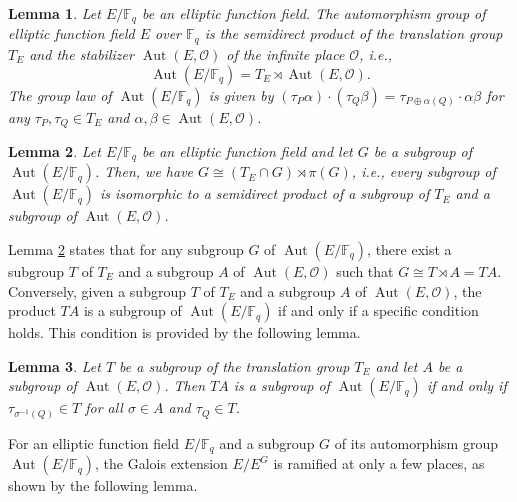 \documentclass[journal,12pt,onecolumn]{IEEEtran}
\newtheorem{lemma}{Lemma}
\begin{document}
\begin{lemma}\label{ell_func_auto}
    Let \( E/\mathbb{F}_q \) be an elliptic function field. The automorphism group of elliptic function field \( E \) over \( \mathbb{F}_q \) is the semidirect product of the translation group \( T_E \) and the stabilizer \( \operatorname{Aut}(E, \mathcal{O}) \) of the infinite place \( \mathcal{O} \), i.e., 
    \[
        \operatorname{Aut}(E/\mathbb{F}_q) = T_E \rtimes \operatorname{Aut}(E, \mathcal{O}).
    \]
    The group law of \( \operatorname{Aut}(E/\mathbb{F}_q) \) is given by \( (\tau_P\alpha) \cdot (\tau_Q\beta) = \tau_{P\oplus\alpha(Q)} \cdot \alpha\beta \) for any \( \tau_P, \tau_Q \in T_E \) and \( \alpha, \beta \in \operatorname{Aut}(E, \mathcal{O}) \).
\end{lemma}

\begin{lemma}\label{ell_func_auto_sub}
    Let \( E/\mathbb{F}_q \) be an elliptic function field and let \( G \) be a subgroup of  \( \operatorname{Aut}(E/\mathbb{F}_q) \). Then, we have \( G \cong (T_E \cap G) \rtimes \pi(G) \), i.e., every subgroup of \( \operatorname{Aut}(E/\mathbb{F}_q) \) is isomorphic to a semidirect product of a subgroup of \( T_E \) and a subgroup of \( \operatorname{Aut}(E, \mathcal{O}) \).
\end{lemma}

Lemma \ref{ell_func_auto_sub} states that for any subgroup $G$ of $\operatorname{Aut}(E/\mathbb{F}_q)$, there exist a subgroup $T$ of $T_E$ and a subgroup $A$ of $\operatorname{Aut}(E, \mathcal{O})$ such that $G \cong T \rtimes A = TA$. Conversely, given a subgroup $T$ of $T_E$ and a subgroup $A$ of $\operatorname{Aut}(E, \mathcal{O})$, the product $TA$ is a subgroup of $\operatorname{Aut}(E/\mathbb{F}_q)$ if and only if a specific condition holds. This condition is provided by the following lemma\cite[Prop. 3.3]{MA2023105686}.

\begin{lemma}\label{sub}
    Let \( T \) be a subgroup of the translation group \( T_E \) and let \( A \) be a subgroup of \( \operatorname{Aut}(E, \mathcal{O}) \). Then \( TA \) is a subgroup of \( \operatorname{Aut}(E / \mathbb{F}_q) \) if and only if \( \tau_{\sigma^{-1}(Q)} \in T \) for all \( \sigma \in A \) and \( \tau_Q \in T \).
\end{lemma}

For an elliptic function field $E/\mathbb{F}_q$ and a subgroup $G$ of its automorphism group $\operatorname{Aut}(E/\mathbb{F}_q)$, the Galois extension $E/E^G$ is ramified at only a few places, as shown by the following lemma\cite[Prop. 4.1]{MA2023105686}.
\end{document}
